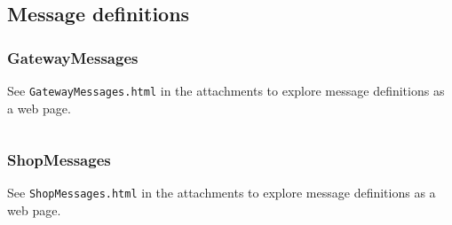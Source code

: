 \documentclass[english]{article}
\begin{document}
\subsection{Message definitions}

\subsubsection{GatewayMessages}
See \texttt{GatewayMessages.html} in the attachments to explore message definitions as a web page.
\vspace{10mm}

\inputminted[label={GatewayMessages.raml}]{YAML}{{api-specification/GatewayMessages.raml}}

\subsubsection{ShopMessages}
See \texttt{ShopMessages.html} in the attachments to explore message definitions as a web page.
\vspace{10mm}
\inputminted[label={ShopMessages.raml}]{YAML}{{api-specification/ShopMessages.raml}}
\end{document}
